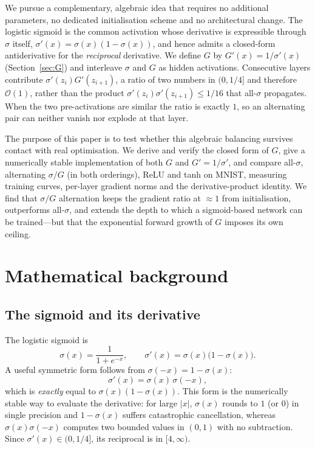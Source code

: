 \documentclass[11pt]{article}
\begin{document}
We pursue a complementary, algebraic idea that requires no additional
parameters, no dedicated initialisation scheme and no architectural change.
The logistic sigmoid is the common activation whose derivative is expressible
through $\sigma$ itself, $\sigma'(x)=\sigma(x)(1-\sigma(x))$, and hence admits a
closed-form antiderivative for the \emph{reciprocal} derivative.  We define
$G$ by $G'(x)=1/\sigma'(x)$ (Section~\ref{sec:G}) and interleave $\sigma$ and
$G$ as hidden activations.  Consecutive layers contribute
$\sigma'(z_i)G'(z_{i+1})$, a ratio of two numbers in $(0,1/4]$ and therefore
$\mathcal{O}(1)$, rather than the product
$\sigma'(z_i)\sigma'(z_{i+1})\le1/16$ that all-$\sigma$ propagates.  When the
two pre-activations are similar the ratio is exactly $1$, so an alternating
pair can neither vanish nor explode at that layer.

The purpose of this paper is to test whether this algebraic balancing survives
contact with real optimisation.  We derive and verify the closed form of $G$,
give a numerically stable implementation of both $G$ and $G'=1/\sigma'$, and
compare all-$\sigma$, alternating $\sigma/G$ (in both orderings), ReLU and tanh
on MNIST, measuring training curves, per-layer gradient norms and the
derivative-product identity.  We find that $\sigma/G$ alternation keeps the
gradient ratio at $\approx1$ from initialisation, outperforms all-$\sigma$, and
extends the depth to which a sigmoid-based network can be trained---but that
the exponential forward growth of $G$ imposes its own ceiling.

\section{Mathematical background}
\label{sec:theory}

\subsection{The sigmoid and its derivative}
\label{sec:sigmoid}
The logistic sigmoid is
\begin{equation}
  \sigma(x)=\frac{1}{1+e^{-x}},\qquad
  \sigma'(x)=\sigma(x)\bigl(1-\sigma(x)\bigr).
\end{equation}
A useful symmetric form follows from $\sigma(-x)=1-\sigma(x)$:
\begin{equation}
  \sigma'(x)=\sigma(x)\,\sigma(-x),
\end{equation}
which is \emph{exactly} equal to $\sigma(x)(1-\sigma(x))$. This form is the
numerically stable way to evaluate the derivative: for large $|x|$, $\sigma(x)$
rounds to $1$ (or $0$) in single precision and $1-\sigma(x)$ suffers
catastrophic cancellation, whereas $\sigma(x)\sigma(-x)$ computes two bounded
values in $(0,1)$ with no subtraction. Since $\sigma'(x)\in(0,1/4]$, its
reciprocal is in $[4,\infty)$.
\end{document}
